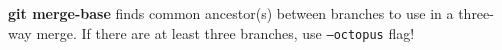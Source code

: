 %

\textbf{git merge-base} finds common ancestor(s) between branches to use in a three-way merge.
If there are at least three branches, use \texttt{--octopus} flag!

%